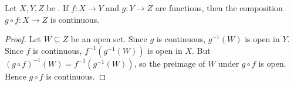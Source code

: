 \begin{proposition} \label{proposition:composition_of_continuous_functions_on_topological_spaces_is_continuous}
    Let $X,Y,Z$ be . If $f : X \to Y$ and $g : Y \to Z$ are  functions, then the composition $g \circ f : X \to Z$ is continuous.
\end{proposition}
\begin{proof}
    Let $W \subseteq Z$ be an open set. Since $g$ is continuous, $g^{-1}(W)$ is open in $Y$. Since $f$ is continuous, $f^{-1}(g^{-1}(W))$ is open in $X$. But $(g \circ f)^{-1}(W) = f^{-1}(g^{-1}(W))$, so the preimage of $W$ under $g \circ f$ is open. Hence $g \circ f$ is continuous.
\end{proof}
